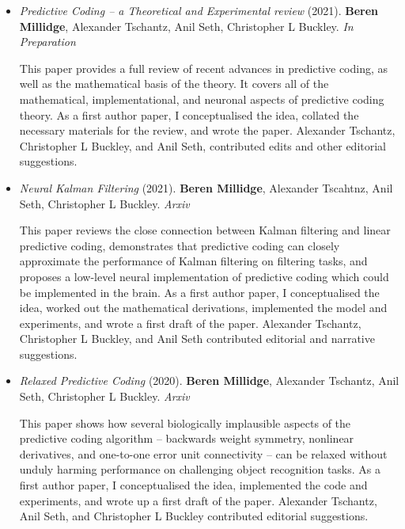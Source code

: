 \begin{itemize}

\item \emph{Predictive Coding -- a Theoretical and Experimental review} (2021). \textbf{Beren Millidge}, Alexander Tschantz, Anil Seth, Christopher L Buckley. \emph{In Preparation}

This paper provides a full review of  recent advances in predictive coding, as well as the mathematical basis of the theory. It covers all of the mathematical, implementational, and neuronal aspects of predictive coding theory. As a first author paper, I conceptualised the idea, collated the necessary materials for the review, and wrote the paper. Alexander Tschantz, Christopher L Buckley, and Anil Seth, contributed edits and other editorial suggestions.

\item  \emph{Neural Kalman Filtering} (2021). \textbf{Beren Millidge}, Alexander Tscahtnz, Anil Seth, Christopher L Buckley. \emph{Arxiv}

This paper reviews the close connection between Kalman filtering and linear predictive coding, demonstrates that predictive coding can closely approximate the performance of Kalman filtering on filtering tasks, and proposes a low-level neural implementation of predictive coding which could be implemented in the brain. As a first author paper, I conceptualised the idea, worked out the mathematical derivations, implemented the model and experiments, and wrote a first draft of the paper. Alexander Tschantz, Christopher L Buckley, and Anil Seth contributed editorial and narrative suggestions.

\item  \emph{Relaxed Predictive Coding} (2020). \textbf{Beren Millidge}, Alexander Tschantz, Anil Seth, Christopher L Buckley. \emph{Arxiv}

This paper shows how several biologically implausible aspects of the predictive coding algorithm -- backwards weight symmetry, nonlinear derivatives, and one-to-one error unit connectivity -- can be relaxed without unduly harming performance on challenging object recognition tasks. As a first author paper, I conceptualised the idea, implemented the code and experiments, and wrote up a first draft of the paper. Alexander Tschantz, Anil Seth, and Christopher L Buckley contributed editorial suggestions.



\end{itemize}
